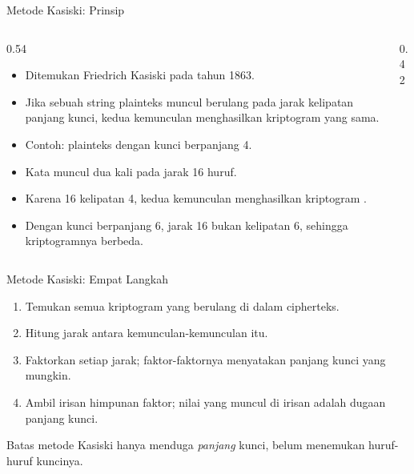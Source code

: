 \documentclass[aspectratio=169,11pt]{beamer}
\begin{document}
\begin{frame}{Metode Kasiski: Prinsip}
    \begin{columns}[T,onlytextwidth]
        \begin{column}{0.54\textwidth}
            \footnotesize
            \begin{itemize}
                \item Ditemukan Friedrich Kasiski pada tahun 1863.
                \item Jika sebuah string plainteks muncul berulang pada jarak
                      kelipatan panjang kunci, kedua kemunculan menghasilkan
                      kriptogram yang sama.
                \item Contoh: plainteks 
                      dengan kunci  berpanjang 4.
                \item Kata  muncul dua kali pada jarak 16 huruf.
                \item Karena 16 kelipatan 4, kedua kemunculan menghasilkan
                      kriptogram .
                \item Dengan kunci  berpanjang 6, jarak 16 bukan
                      kelipatan 6, sehingga kriptogramnya berbeda.
            \end{itemize}
        \end{column}
        \begin{column}{0.42\textwidth}
            \centering
        \end{column}
    \end{columns}
\end{frame}

\begin{frame}{Metode Kasiski: Empat Langkah}
    \footnotesize
    \begin{enumerate}
        \item Temukan semua kriptogram yang berulang di dalam cipherteks.
        \item Hitung jarak antara kemunculan-kemunculan itu.
        \item Faktorkan setiap jarak; faktor-faktornya menyatakan panjang
              kunci yang mungkin.
        \item Ambil irisan himpunan faktor; nilai yang muncul di irisan
              adalah dugaan panjang kunci.
    \end{enumerate}
    \vspace{0.2cm}
    \begin{alertblock}{Batas metode}
        \footnotesize
        Kasiski hanya menduga \emph{panjang} kunci, belum menemukan
        huruf-huruf kuncinya.
    \end{alertblock}
\end{frame}
\end{document}
